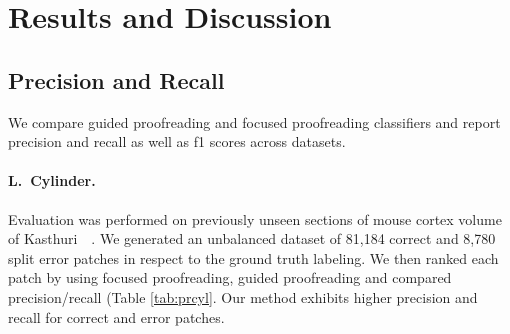\section{Results and Discussion}


\subsection{Precision and Recall}

We compare guided proofreading and focused proofreading classifiers and report precision and recall as well as f1 scores across datasets.

\paragraph{L.~Cylinder.} Evaluation was performed on previously unseen sections of mouse cortex volume of Kasthuri~\etal~\cite{kasthuri2015saturated}. We generated an unbalanced dataset of 81,184 correct and 8,780 split error patches in respect to the ground truth labeling. We then ranked each patch by using focused proofreading, guided proofreading and compared precision/recall (Table \ref{tab:prcyl}. Our method exhibits higher precision and recall for correct and error patches.

\begin{table}[t]
\caption{Classifier comparison on an unbalanced test set of the L.~Cylinder volume.}%
\label{tab:prcyl}
\end{table}

